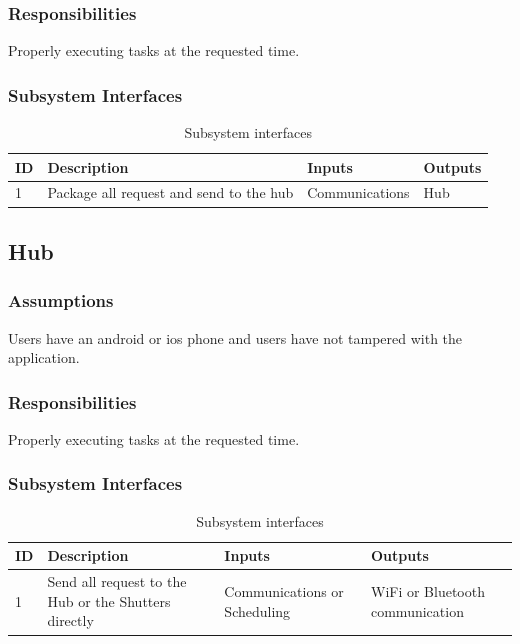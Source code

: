 \subsubsection{Responsibilities}
Properly executing tasks at the requested time.

\subsubsection{Subsystem Interfaces}

\begin {table}[H]
\caption {Subsystem interfaces} 
\begin{center}
    \begin{tabular}{ | p{1cm} | p{7cm} | p{4cm} | p{3cm} |}
    \hline
    ID & Description & Inputs & Outputs \\ \hline
    1 &Package all request and send to the hub& Communications &Hub\\ \hline
    \end{tabular}
\end{center}
\end{table}

\subsection{Hub}
\subsubsection{Assumptions}
Users have an android or ios phone and users have not tampered with the application. 

\subsubsection{Responsibilities}
Properly executing tasks at the requested time.

\subsubsection{Subsystem Interfaces}

\begin {table}[H]
\caption {Subsystem interfaces} 
\begin{center}
    \begin{tabular}{ | p{1cm} | p{7cm} | p{5cm} | p{4cm} |}
    \hline
    ID & Description & Inputs & Outputs \\ \hline
    1 &Send all request to the Hub or the Shutters directly &Communications or Scheduling &WiFi or Bluetooth communication\\ \hline
    \end{tabular}
\end{center}
\end{table}
